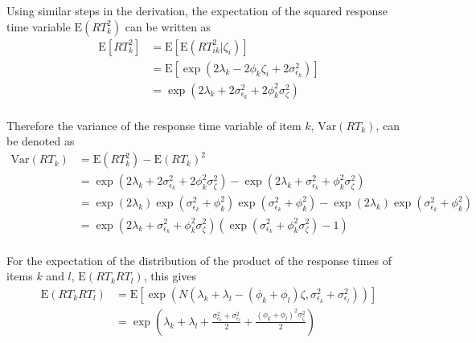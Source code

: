 \documentclass[a4paper,man,apacite,donotrepeattitle]{apa6}
\newcommand{\E}{\mathrm{E}}
\newcommand{\Var}{\mathrm{Var}}
\begin{document}
Using similar steps in the derivation, the expectation of the squared response time variable $\E(RT^2_k)$ can be written as
\begin{equation}
\label{meanRT2}
\begin{split}
\E[RT^2_k] & = \E \left[ \E(RT^2_{ik} | \zeta_i)  \right] \\
           & = \E \left[ \exp \left( 2 \lambda_{k} - 2 \phi_{k} \zeta_i + 2 \sigma^2_{\epsilon_{k}} \right) \right]  \\
           & = \exp \left( 2 \lambda_{k} + 2 \sigma^2_{\epsilon_{k}} + 2 \phi^2_{k} \sigma^2_{\zeta} \right) \\
\end{split}
\end{equation}

Therefore the variance of the response time variable of item $k$, $\Var(RT_k)$, can be denoted as
\begin{equation}
\label{VarRT}
\begin{split}
\Var(RT_k) & = \E(RT^2_k) - \E(RT_k)^2 \\ 
           & = \exp \left( 2 \lambda_{k} + 2 \sigma^2_{\epsilon_{k}} + 2 \phi^2_{k} \sigma^2_{\zeta} \right) - \exp \left( 2 \lambda_{k} + \sigma^2_{\epsilon_{k}} + \phi^2_{k} \sigma^2_{\zeta} \right) \\
           & = \exp \left( 2 \lambda_{k} \right) \exp \left( \sigma^2_{\epsilon_{k}} + \phi^2_{k} \right) \exp \left( \sigma^2_{\epsilon_{k}} + \phi^2_{k} \right) - \exp \left( 2 \lambda_{k} \right) \exp \left( \sigma^2_{\epsilon_{k}} + \phi^2_{k} \right) \\
          & = \exp \left( 2 \lambda_{k} + \sigma^2_{\epsilon_{k}} + \phi^2_{k} \sigma^2_{\zeta} \right) \left( \exp(\sigma^2_{\epsilon_{k}} + \phi^2_{k} \sigma^2_{\zeta}) - 1 \right) \\
\end{split}
\end{equation}

For the expectation of the distribution of the product of the response times of items $k$ and $l$, $\E(RT_k RT_l)$, this gives
\begin{equation}
\label{meanRTRT}
\begin{split}
\E(RT_k RT_l) & =   \E \left[ \exp \left( N( \lambda_{k} +  \lambda_{l} - (\phi_{k} + \phi_{l}) \zeta, \sigma^2_{\epsilon_{k}} + \sigma^2_{\epsilon_{l}} )\right) \right] \\
               & = \exp \left( \lambda_{k} + \lambda_{l} +  \frac{\sigma^2_{\epsilon_{k}} + \sigma^2_{\epsilon_{l}}}{2} + \frac{(\phi_{k} + \phi_{l})^2 \sigma^2_{\zeta}}{2} \right) \\  
\end{split}
\end{equation}
\end{document}
